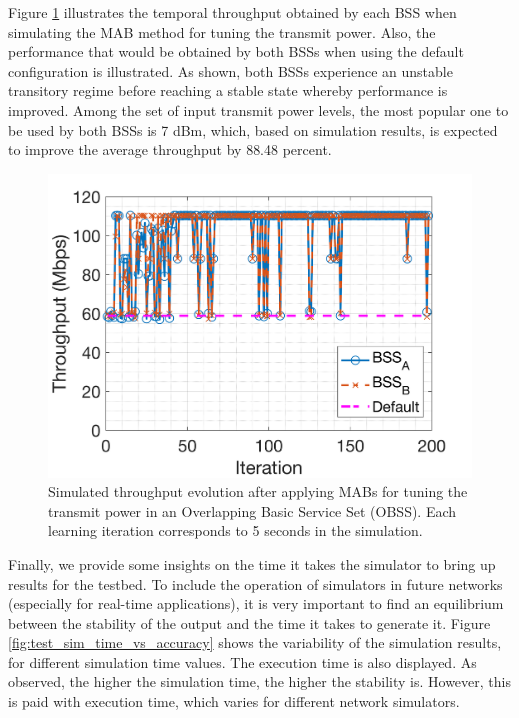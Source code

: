 \documentclass[journal]{IEEEtran}
\begin{document}
	Figure \ref{fig:results_komondor} illustrates the temporal throughput obtained by each BSS when simulating the MAB method for tuning the transmit power. Also, the performance that would be obtained by both BSSs when using the default configuration is illustrated. As shown, both BSSs experience an unstable transitory regime before reaching a stable state whereby performance is improved. Among the set of input transmit power levels, the most popular one to be used by both BSSs is 7 dBm, which, based on simulation results, is expected to improve the average throughput by 88.48 percent.
	
	\begin{figure}[ht!]
		\centering
		\includegraphics[width=0.8\columnwidth]{throughput_evolution_komondor.png}
		\caption{Simulated throughput evolution after applying MABs for tuning the transmit power in an Overlapping Basic Service Set (OBSS). Each learning iteration corresponds to 5 seconds in the simulation.}
		\label{fig:results_komondor}
	\end{figure}
	
	Finally, we provide some insights on the time it takes the simulator to bring up results for the testbed. To include the operation of simulators in future networks (especially for real-time applications), it is very important to find an equilibrium between the stability of the output and the time it takes to generate it. Figure \ref{fig:test_sim_time_vs_accuracy} shows the variability of the simulation results, for different simulation time values. The execution time is also displayed. As observed, the higher the simulation time, the higher the stability is. However, this is paid with execution time, which varies for different network simulators.
	
\end{document}
